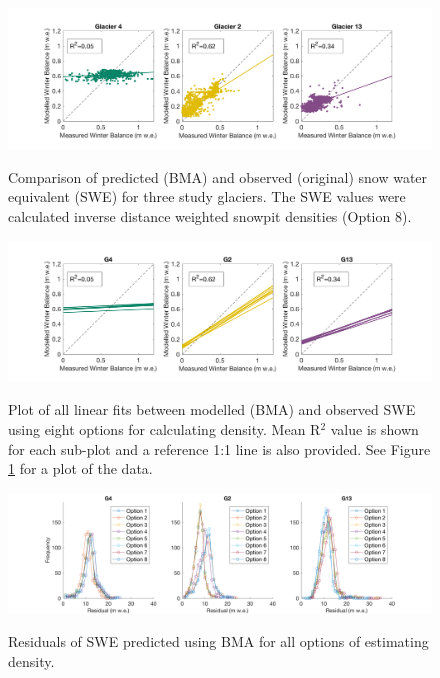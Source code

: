 \documentclass[12pt]{article}
\begin{document}
\begin{landscape}
\begin{figure}
	\centering
	\includegraphics[height = 0.5\textwidth]{BMSfit_opt8.png}\\
	\caption{Comparison of predicted (BMA) and observed (original) snow water equivalent (SWE) for three study glaciers. The SWE values were calculated inverse distance weighted snowpit densities (Option 8).}
	\label{fig:BMSfit_opt8}
\end{figure}

\pagebreak

\begin{figure}
	\centering
	\includegraphics[height = 0.4\textwidth]{BMSfit_allLines.png}\\
	\caption{Plot of all linear fits between modelled (BMA) and observed SWE using eight options for calculating density. Mean R$^2$ value is shown for each sub-plot and a reference 1:1 line is also provided. See Figure \ref{fig:BMSfit_opt8} for a plot of the data. }
	\label{fig:BMSfit_allLines}
\end{figure}

\begin{figure}
	\centering
	\includegraphics[height = 0.4\textwidth]{BMSresiduals_all.png}\\
	\caption{Residuals of SWE predicted using BMA for all options of estimating density.}
	\label{fig:BMSresiduals_all}
\end{figure}

\end{landscape}
 
\end{document}

